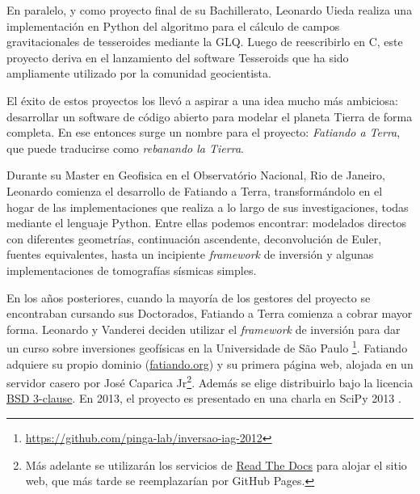 En paralelo, y como proyecto final de su Bachillerato, Leonardo Uieda realiza
una implementación en Python del algoritmo para el cálculo de campos
gravitacionales de tesseroides mediante la \ac{GLQ}.
Luego de reescribirlo en C, este proyecto deriva en el lanzamiento del software
Tesseroids \citep{uieda2016} que ha sido ampliamente utilizado por la comunidad
geocientista.

El éxito de estos proyectos los llevó a aspirar a una idea mucho más
ambiciosa: desarrollar un software de código abierto para modelar el planeta
Tierra de
forma completa.
En ese entonces surge un nombre para el proyecto: \emph{Fatiando a Terra}, que
puede traducirse como \emph{rebanando la Tierra}.

Durante su Master en Geofisica en el Observatório Nacional, Rio de Janeiro,
Leonardo comienza el desarrollo de Fatiando a Terra, transformándolo en el hogar
de las implementaciones que realiza a lo largo de sus investigaciones, todas
mediante el lenguaje Python.
Entre ellas podemos encontrar: modelados directos con diferentes geometrías,
continuación ascendente, deconvolución de Euler, fuentes equivalentes, hasta un
incipiente \emph{framework} de inversión y algunas implementaciones de
tomografías sísmicas simples.

En los años posteriores, cuando la mayoría de los gestores del proyecto se
encontraban cursando sus Doctorados, Fatiando a Terra comienza a cobrar mayor
forma.
Leonardo y Vanderei deciden utilizar el \emph{framework} de inversión para dar
un curso sobre inversiones geofísicas en la Universidade de São Paulo%
\footnote{\url{https://github.com/pinga-lab/inversao-iag-2012}}.
Fatiando adquiere su propio dominio
(\href{https://www.fatiando.org}{fatiando.org}) y su primera página web,
alojada en un servidor casero por José Caparica Jr\footnote{%
    Más adelante se utilizarán los servicios de
    \href{https://readthedocs.org/}{Read The Docs} para alojar el sitio web,
    que más tarde se reemplazarían por GitHub Pages.
}.
Además se elige distribuirlo bajo la licencia
\href{https://opensource.org/licenses/BSD-3-Clause}{BSD 3-clause}.
En 2013, el proyecto es presentado en una charla en SciPy 2013
\citep{uieda2013}.

